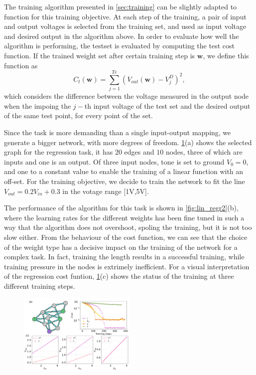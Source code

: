 \documentclass[reprint,superscriptaddress,prb,showkeys]{revtex4-2}
\newcommand{\brac}[1]{\left(#1 \right)} %
\begin{document}
The training algorithm presented in \cref{sec:training} can be slightly adapted to function for this training objective. At each step of the training, a pair of input and output voltages is selected from the training set, and used as input voltage and desired output in the algorithm above. In order to evaluate how well the algorithm is performing, the testset is evaluated by computing the test cost function. If the trained weight set after certain training step is $\boldsymbol{w}$, we define this function as
\[
C_{t}\left( \boldsymbol{w} \right) = \sum_{j=1}^{Te}\brac{V_{out}\brac{\boldsymbol{w}} - V_j^D}^2,
\]
which considers the difference between the voltage measured in the output node when the impoing the $j-$th input voltage of the test set and the desired output of the same test point, for every point of the set. 

Since the task is more demanding than a single input-output mapping, we generate a bigger network, with more degrees of freedom. \cref{fig:lin_regr1}(a) shows the selected graph for the regression task, it has $20$ edges and $10$ nodes, three of which are inputs and one is an output. Of three input nodes, tone is set to ground $V_0 = 0$, and one to a constant value to enable the training of a linear function with an off-set. For the training objective, we decide to train the network to fit the line $V_{out} = 0.2 V_{in} + 0.3$ in the votage range [1V,5V]. 

The performance of the algorithm for this task is shown in \cref{fig:lin_regr2}(b), where the learning rates for the different weights has been fine tuned in such a way that the algorithm does not overshoot, spoling the training, but it is not too slow either. From the behaviour of the cost function, we can see that the choice of the weight type has a decisive impact on the training of the network for a complex task. In fact, training the length results in a successful training, while training pressure in the nodes is extrimely inefficient. For a visual interpretation of the regression cost funtion, \cref{fig:lin_regr1}(c) shows the status of the training at three different training steps.



\begin{figure}[h]
    \centering
    \includegraphics[width=0.5\textwidth]{plots/regression/G00010001.pdf}
    \caption{}\label{fig:lin_regr1}
\end{figure} 
\end{document}
